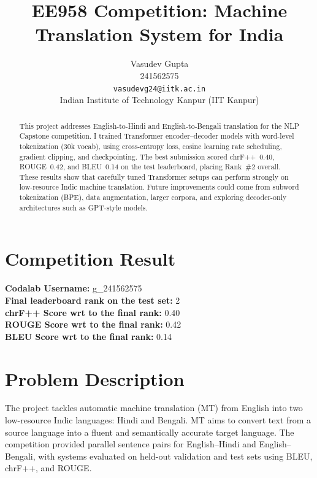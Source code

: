 \documentclass[11pt, oneside]{article}   	%
\title{EE958 Competition: Machine Translation System for India}
\author{
    Vasudev Gupta  \\ 
    241562575\\
   {\tt vasudevg24@iitk.ac.in}\\
{Indian Institute of Technology Kanpur (IIT Kanpur)}
}
\date{}							%
\begin{document}
\maketitle

\begin{abstract}
This project addresses English-to-Hindi and English-to-Bengali translation for the NLP Capstone competition. I trained Transformer encoder–decoder models with word-level tokenization (30k vocab), using cross-entropy loss, cosine learning rate scheduling, gradient clipping, and checkpointing. The best submission scored chrF++~0.40, ROUGE~0.42, and BLEU~0.14 on the test leaderboard, placing Rank~\#2 overall.  
These results show that carefully tuned Transformer setups can perform strongly on low-resource Indic machine translation. Future improvements could come from subword tokenization (BPE), data augmentation, larger corpora, and exploring decoder-only architectures such as GPT-style models.
\end{abstract}



\section{Competition Result}
\textbf{Codalab Username:} g\_241562575 \\
\textbf{Final leaderboard rank on the test set:} 2 \\
\textbf{chrF++ Score wrt to the final rank:} 0.40 \\
\textbf{ROUGE Score wrt to the final rank:} 0.42 \\
\textbf{BLEU Score wrt to the final rank:} 0.14

\section{Problem Description}

The project tackles automatic machine translation (MT) from English into two low-resource Indic languages: Hindi and Bengali. MT aims to convert text from a source language into a fluent and semantically accurate target language. The competition provided parallel sentence pairs for English–Hindi and English–Bengali, with systems evaluated on held-out validation and test sets using BLEU, chrF++, and ROUGE.
\end{document}
